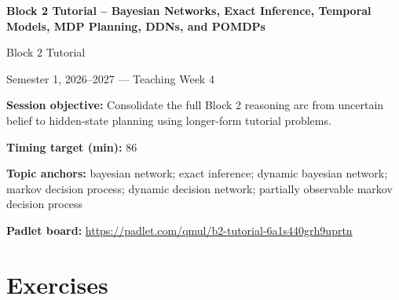 \documentclass[11pt]{article}
\begin{document}
\begin{center}\LARGE\bfseries Block 2 Tutorial -- Bayesian Networks, Exact Inference, Temporal Models, MDP Planning, DDNs, and POMDPs\end{center}

\begin{center}\large Block 2 Tutorial\end{center}

\begin{center}Semester 1, 2026--2027 --- Teaching Week 4\end{center}

\begin{tcolorbox}[colback=MidnightBlue!4,colframe=MidnightBlue,title={Session Overview},fonttitle=\bfseries,breakable]
\textbf{Session objective:} Consolidate the full Block 2 reasoning arc from uncertain belief to hidden-state planning using longer-form tutorial problems.

\textbf{Timing target (min):} 86

\textbf{Topic anchors:} bayesian network; exact inference; dynamic bayesian network; markov decision process; dynamic decision network; partially observable markov decision process

\textbf{Padlet board:} \url{https://padlet.com/qmul/b2-tutorial-6a1s440grh9uprtn}
\end{tcolorbox}

\section*{Exercises}
\end{document}
